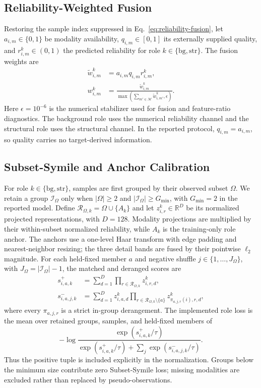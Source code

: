 \subsection{Reliability-Weighted Fusion}
Restoring the sample index suppressed in Eq.~\ref{eq:reliability-fusion}, let $a_{i,m}\in\{0,1\}$ be modality availability, $q_{i,m}\in[0,1]$ its externally supplied quality, and $r_{i,m}^k\in(0,1)$ the predicted reliability for role $k\in\{\mathrm{bg},\mathrm{str}\}$. The fusion weights are
\begin{align}
\widetilde w_{i,m}^k
&=a_{i,m}q_{i,m}r_{i,m}^k,\nonumber\\
w_{i,m}^k
&=\frac{\widetilde w_{i,m}^k}
{\max\!\left(\sum_{m'\in\mathcal M}\widetilde w_{i,m'}^k,\epsilon\right)}.
\label{eq:fusion-normalization}
\end{align}
Here $\epsilon=10^{-6}$ is the numerical stabilizer used for fusion and feature-ratio diagnostics.
The background role uses the numerical reliability channel and the structural role uses the structural channel. In the reported protocol, $q_{i,m}=a_{i,m}$, so quality carries no target-derived information.

\subsection{Subset-Symile and Anchor Calibration}
For role $k\in\{\mathrm{bg},\mathrm{str}\}$, samples are first grouped by their observed subset $\Omega$. We retain a group $\mathcal I_\Omega$ only when $|\Omega|\ge2$ and $|\mathcal I_\Omega|\ge G_{\min}$, with $G_{\min}=2$ in the reported model. Define $\mathcal R_{\Omega,k}=\Omega\cup\{A_k\}$ and let $z^k_{i,r}\in\mathbb R^D$ be its normalized projected representations, with $D=128$. Modality projections are multiplied by their within-subset normalized reliability, while $A_k$ is the training-only role anchor. The anchors use a one-level Haar transform with edge padding and nearest-neighbor resizing; the three detail bands are fused by their pointwise $\ell_2$ magnitude. For each held-fixed member $a$ and negative shuffle $j\in\{1,\ldots,J_\Omega\}$, with $J_\Omega=|\mathcal I_\Omega|-1$, the matched and deranged scores are
\begin{align}
s^+_{i,a,k}
&=\sum_{d=1}^{D}\prod_{r\in\mathcal R_{\Omega,k}} z^k_{i,r,d},\\
s^-_{i,a,j,k}
&=\sum_{d=1}^{D}z^k_{i,a,d}
\prod_{r\in\mathcal R_{\Omega,k}\setminus\{a\}}
z^k_{\pi_{a,j,r}(i),r,d},
\end{align}
where every $\pi_{a,j,r}$ is a strict in-group derangement. The implemented role loss is the mean over retained groups, samples, and held-fixed members of
\begin{equation}
-\log
\frac{\exp(s^+_{i,a,k}/\tau)}
{\exp(s^+_{i,a,k}/\tau)+\sum_j\exp(s^-_{i,a,j,k}/\tau)}.
\label{eq:subset-symile-detail}
\end{equation}
Thus the positive tuple is included explicitly in the normalization. Groups below the minimum size contribute zero Subset-Symile loss; missing modalities are excluded rather than replaced by pseudo-observations.

